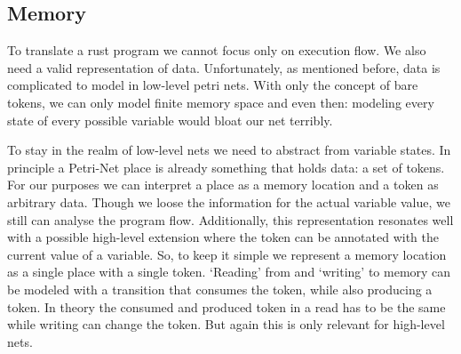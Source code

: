 \subsection{Memory}
To translate a rust program we cannot focus only on execution flow.
We also need a valid representation of data.
Unfortunately, as mentioned before, data is complicated to model in low-level petri nets.
With only the concept of bare tokens, we can only model finite memory space and even then: modeling every state of every possible variable would bloat our net terribly.

To stay in the realm of low-level nets we need to abstract from variable states.
In principle a Petri-Net place is already something that holds data: a set of tokens.
For our purposes we can interpret a place as a memory location and a token as arbitrary data.
Though we loose the information for the actual variable value, we still can analyse the program flow.
Additionally, this representation resonates well with a possible high-level extension where the token can be annotated with the current value of a variable.
So, to keep it simple we represent a memory location as a single place with a single token.
`Reading' from and `writing' to memory can be modeled with a transition that consumes the token, while also producing a token.
In theory the consumed and produced token in a read has to be the same while writing can change the token.
But again this is only relevant for high-level nets.

